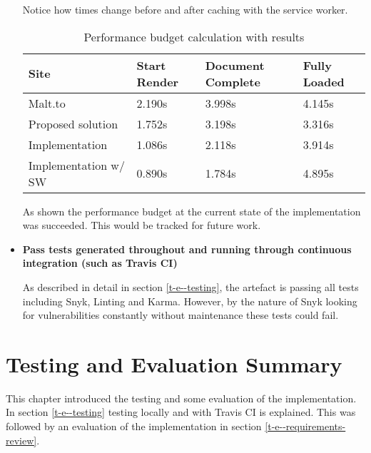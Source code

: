\begin{itemize}
    Notice how times change before and after caching with the service worker.

    \begin{table}[H]
    \centering
    \begin{tabular}{|l|l|l|l|}
    \hline
    \textbf{Site}        & \textbf{Start Render} & \textbf{Document Complete} & \textbf{Fully Loaded} \\ \hline
    Malt.to              & 2.190s                & 3.998s                     & 4.145s                \\ \hline
    Proposed solution    & 1.752s                & 3.198s                     & 3.316s                \\ \hline
    Implementation       & 1.086s                & 2.118s                     & 3.914s                \\ \hline
    Implementation w/ SW & 0.890s                & 1.784s	                    & 4.895s	              \\ \hline
    \end{tabular}
    \caption{Performance budget calculation with results}
    \label{table-performance-budget-results}
    \end{table}

    As shown the performance budget at the current state of the implementation was succeeded. This would be tracked for future work.

  \item \textbf{Pass tests generated throughout and running through continuous integration (such as Travis CI)}

    As described in detail in section \ref{t-e--testing}, the artefact is passing all tests including Snyk, Linting and Karma. However, by the nature of Snyk looking for vulnerabilities constantly without maintenance these tests could fail.

\end{itemize}

\section{Testing and Evaluation Summary} \label{t-e--testing-and-evaluation-summary}

This chapter introduced the testing and some evaluation of the implementation. In section \ref{t-e--testing} testing locally and with Travis CI is explained. This was followed by an evaluation of the implementation in section \ref{t-e--requirements-review}.
